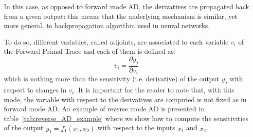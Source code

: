 In this case, as opposed to forward mode AD, the derivatives are propagated back from a given output: this means that the underlying mechanism is similar, yet more general, to backpropagation algorithm used in neural networks.

To do so, different variables, called adjoints, are associated to each variable $v_i$ of the Forward Primal Trace and each of them is defined as:
\[
\overline{v}_i = \frac{\partial y_j}{\partial v_i}
\]
which is nothing more than the sensitivity (i.e. derivative) of the output $y_j$ with respect to changes in $v_i$. It is important for the reader to note that, with this mode, the variable with respect to the derivatives are computed is not fixed as in forward mode AD. An example of reverse mode AD is presented in table~\ref{tab:reverse_AD_example} where we show how to compute the sensitivities of the output $y_1 = \tilde{f}_1(x_1, x_2)$ with respect to the inputs $x_1$ and $x_2$.

